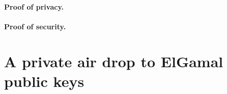 \documentclass[11pt]{article}
\begin{document}
\paragraph{Proof of privacy.}


\paragraph{Proof of security.}
 


\section{A private air drop to ElGamal public keys}





\end{document}
